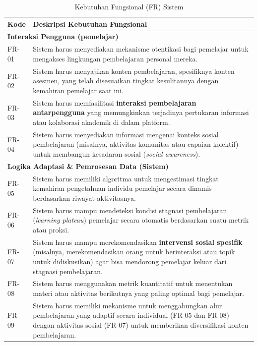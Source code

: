 \begin{table}[H]
    \centering\caption{Kebutuhan Fungsional (FR) Sistem}\label{tbl:kebutuhan-fungsional}
\renewcommand{\arraystretch}{1.3}
\begin{tabular}{|l|p{}|}
\hline
\textbf{Kode} & \textbf{Deskripsi Kebutuhan Fungsional} \\
\hline

\multicolumn{2}{|l|}{\textbf{Interaksi Pengguna (pemelajar)}} \\
\hline
FR-01 & Sistem harus menyediakan mekanisme otentikasi bagi pemelajar untuk mengakses lingkungan pembelajaran personal mereka. \\
\hline
FR-02 & Sistem harus menyajikan konten pembelajaran, spesifiknya konten asesmen, yang telah disesuaikan tingkat kesulitannya dengan kemahiran pemelajar saat ini. \\
\hline
FR-03 & Sistem harus memfasilitasi \textbf{interaksi pembelajaran antarpengguna} yang memungkinkan terjadinya pertukaran informasi atau kolaborasi akademik di dalam platform. \\
\hline
FR-04 & Sistem harus menyediakan informasi mengenai konteks sosial pembelajaran (misalnya, aktivitas komunitas atau capaian kolektif) untuk membangun kesadaran sosial (\textit{social awareness}). \\
\hline

\multicolumn{2}{|l|}{\textbf{Logika Adaptasi \& Pemrosesan Data (Sistem)}} \\
\hline
FR-05 & Sistem harus memiliki algoritma untuk mengestimasi tingkat kemahiran pengetahuan individu pemelajar secara dinamis berdasarkan riwayat aktivitasnya. \\
\hline
FR-06 & Sistem harus mampu mendeteksi kondisi stagnasi pembelajaran (\textit{learning plateau}) pemelajar secara otomatis berdasarkan suatu metrik atau proksi. \\
\hline
FR-07 & Sistem harus mampu merekomendasikan \textbf{intervensi sosial spesifik} (misalnya, merekomendasikan orang untuk berinteraksi atau topik untuk didiskusikan) agar bisa mendorong pemelajar keluar dari stagnasi pembelajaran. \\
\hline
FR-08 & Sistem harus menggunakan metrik kuantitatif untuk menentukan materi atau aktivitas berikutnya yang paling optimal bagi pemelajar. \\
\hline
FR-09 & Sistem harus memiliki mekanisme untuk menggabungkan alur pembelajaran yang adaptif secara individual (FR-05 dan FR-08) dengan aktivitas sosial (FR-07) untuk memberikan diversifikasi konten pembelajaran. \\
\hline
\end{tabular}
\end{table}